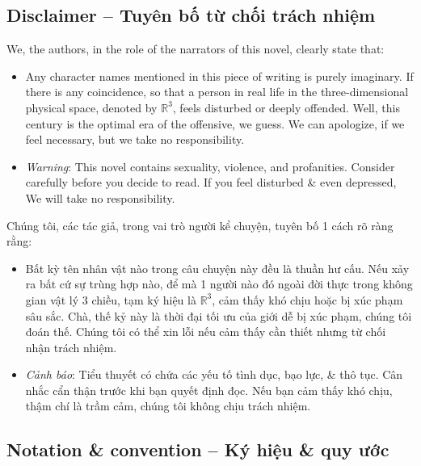 \documentclass[12pt]{article}
\begin{document}
\subsection{Disclaimer -- Tuyên bố từ chối trách nhiệm}
We, the authors, in the role of the narrators of this novel, clearly state that:
\begin{itemize}
	\item Any character names mentioned in this piece of writing is purely imaginary. If there is any coincidence, so that a person in real life in the three-dimensional physical space, denoted by $\mathbb{R}^3$, feels disturbed or deeply offended. Well, this century is the optimal era of the offensive, we guess. We can apologize, if we feel necessary, but we take no responsibility.
	\item {\it Warning}: This novel contains sexuality, violence, and profanities. Consider carefully before you decide to read. If you feel disturbed \& even depressed, We will take no responsibility.
\end{itemize}
Chúng tôi, các tác giả, trong vai trò người kể chuyện, tuyên bố 1 cách rõ ràng rằng:
\begin{itemize}
	\item Bất kỳ tên nhân vật nào trong câu chuyện này đều là thuần hư cấu. Nếu xảy ra bất cứ sự trùng hợp nào, để mà 1 người nào đó ngoài đời thực trong không gian vật lý 3 chiều, tạm ký hiệu là $\mathbb{R}^3$, cảm thấy khó chịu hoặc bị xúc phạm sâu sắc. Chà, thế kỷ này là thời đại tối ưu của giới dễ bị xúc phạm, chúng tôi đoán thế. Chúng tôi có thể xin lỗi nếu cảm thấy cần thiết nhưng từ chối nhận trách nhiệm.
	\item {\it Cảnh báo}: Tiểu thuyết có chứa các yếu tố tình dục, bạo lực, \& thô tục. Cân nhắc cẩn thận trước khi bạn quyết định đọc. Nếu bạn cảm thấy khó chịu, thậm chí là trầm cảm, chúng tôi không chịu trách nhiệm.
\end{itemize}

\subsection{Notation \& convention -- Ký hiệu \& quy ước}
\end{document}
